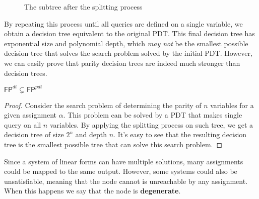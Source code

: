 \begin{figure}[H]

    \caption{The subtree after the splitting process}
\end{figure}

By repeating this process until all queries are defined on a single variable, we obtain a decision tree equivalent to the original PDT. This final decision tree has exponential size and polynomial depth, which \textit{may not} be the smallest possible decision tree that solves the search problem solved by the initial PDT. However, we can easily prove that parity decision trees are indeed much stronger than decision trees.

\begin{proposition}
    $\mathsf{FP}^{dt} \subsetneq \mathsf{FP}^{pdt}$
\end{proposition}

\begin{proof}
    Consider the search problem of determining the parity of $n$ variables for a given assignment $\alpha$. This problem can be solved by a PDT that makes single query on all $n$ variables. By applying the splitting process on such tree, we get a decision tree of size $2^n$ and depth $n$. It's easy to see that the resulting decision tree is the smallest possible tree that can solve this search problem.
\end{proof}

\newpage

Since a system of linear forms can have multiple solutions, many assignments could be mapped to the same output. However, some systems could also be unsatisfiable, meaning that the node cannot is unreachable by any assignment. When this happens we say that the node is \textbf{degenerate}.

